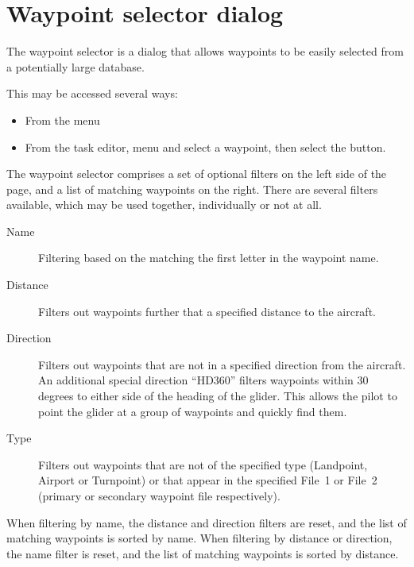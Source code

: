 \documentclass[a4paper,12pt]{refrep}
\begin{document}
\section{Waypoint selector dialog}
The waypoint selector is a dialog that allows waypoints to be easily selected
from a potentially large database.

This may be accessed several ways:
\begin{itemize}
\item From the menu \blink{}
\item From the task editor, menu \blink{} and select
 a waypoint, then select the  button.
\end{itemize}

The waypoint selector comprises a set of optional filters on the left
side of the page, and a list of matching waypoints on the right.
There are several filters available, which may be used together,
individually or not at all.
\begin{description}
\item[Name] Filtering based on the matching the first letter in the waypoint name. 
\item[Distance] Filters out waypoints further that a specified distance to the aircraft.
\item[Direction] Filters out waypoints that are not in a specified direction from the aircraft. 
   An additional special direction ``HD360'' filters waypoints within 30 degrees to either side of the 
   heading of the glider.  This allows the pilot to point the glider at a group of
  waypoints and quickly find them.
\item[Type] Filters out waypoints that are not of the specified type (Landpoint, Airport or Turnpoint) or
   that appear in the specified File~1 or File~2 (primary or secondary waypoint file respectively).
\end{description}
When filtering by name, the distance and direction filters are reset,
and the list of matching waypoints is sorted by name.  When filtering
by distance or direction, the name filter is reset, and the list
of matching waypoints is sorted by distance.
\end{document}
